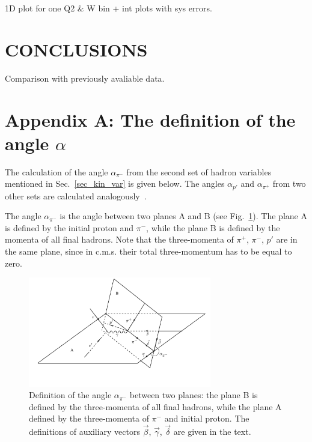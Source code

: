 \documentclass[prc,twocolumn,superscriptaddress,showpacs,amssymb,amsmath,amsfonts,linenumbers,aps]{revtex4-1}
\begin{document}
1D plot for one Q2 \& W bin + int plots with sys errors.

\section{CONCLUSIONS}





Comparison with previously avaliable data.

\begin{acknowledgments}


\end{acknowledgments}

\clearpage
\section*{Appendix A: The definition of the angle $\alpha$}
\label{app_a}


The calculation of the angle $\alpha_{\pi^{-}}$ from the second set of hadron variables mentioned in Sec.~\ref{sec_kin_var} is given below. The angles $\alpha_{p'}$ and $\alpha_{\pi^{+}}$ from two other sets are calculated analogously~\cite{Fed_an_note:2017}.

The angle $\alpha_{\pi^{-}}$ is the angle between two planes A and B (see Fig.~\ref{fig:cr_sec_kinematic2}).
The plane A is defined by
the initial proton and $\pi^{-}$, while the plane B is defined by the momenta of
all final hadrons. Note that the three-momenta of $\pi^{+}$,
$\pi^{-}$, $p'$ are in the same plane, since in c.m.s.
their total three-momentum has to be equal to zero.


\begin{figure}[htp]
\begin{center}
\includegraphics[width=8cm]{pictures/angles/alpha1.pdf}
\caption{\small Definition of the angle $\alpha_{\pi^{-}}$ between two planes: the plane B is defined by the three-momenta of all final hadrons, while the plane A defined by  the three-momenta of $\pi^{-}$ and initial proton. The definitions of  auxiliary vectors $\vec \beta$, $\vec \gamma$, $\vec \delta$ are given in the text.} \label{fig:cr_sec_kinematic2}
\end{center}
\end{figure}
\end{document}
